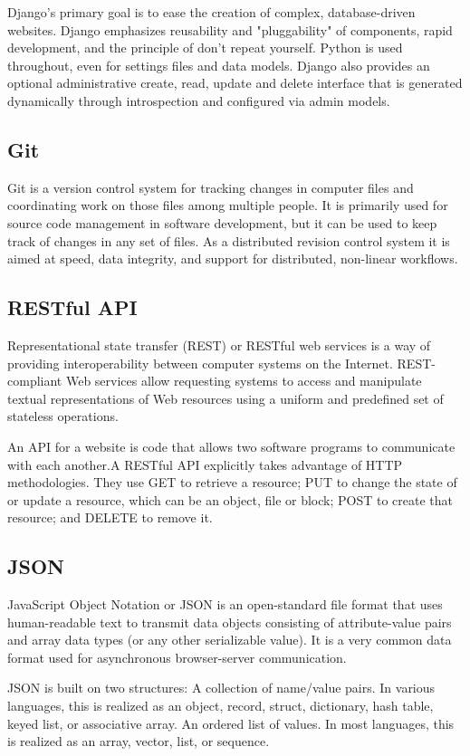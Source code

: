 \documentclass[BTech]{srmuthesis}
\begin{document}
Django's primary goal is to ease the creation of complex, database-driven websites. Django emphasizes reusability and "pluggability" of components, rapid development, and the principle of don't repeat yourself. Python is used throughout, even for settings files and data models. Django also provides an optional administrative create, read, update and delete interface that is generated dynamically through introspection and configured via admin models.
\subsection{Git}
Git is a version control system for tracking changes in computer files and coordinating work on those files among multiple people. It is primarily used for source code management in software development, but it can be used to keep track of changes in any set of files. As a distributed revision control system it is aimed at speed, data integrity, and support for distributed, non-linear workflows.
\subsection{RESTful \ac{API}}
Representational state transfer (REST) or RESTful web services is a way of providing interoperability between computer systems on the Internet. REST-compliant Web services allow requesting systems to access and manipulate textual representations of Web resources using a uniform and predefined set of stateless operations.

An \ac{API} for a website is code that allows two software programs to communicate with each another.A RESTful \ac{API} explicitly takes advantage of HTTP methodologies. They use GET to retrieve a resource; PUT to change the state of or update a resource, which can be an object, file or block; POST to create that resource; and DELETE to remove it.
\subsection{\ac{JSON}}
JavaScript Object Notation or \ac{JSON} is an open-standard file format that uses human-readable text to transmit data objects consisting of attribute-value pairs and array data types (or any other serializable value). It is a very common data format used for asynchronous browser-server communication.

JSON is built on two structures:
A collection of name/value pairs. In various languages, this is realized as an object, record, struct, dictionary, hash table, keyed list, or associative array.
An ordered list of values. In most languages, this is realized as an array, vector, list, or sequence.
\end{document}
